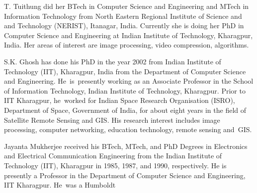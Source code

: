 \documentclass{doublecol-new}
\theoremstyle{TH}{
\newtheorem{lemma}{Lemma}[section]
\newtheorem{theorem}{Theorem}
\newtheorem{corrolary}{Corrolary}
\newtheorem{conjecture}[lemma]{Conjecture}
\newtheorem{proposition}[lemma]{Proposition}
\newtheorem{claim}[lemma]{Claim}
\newtheorem{stheorem}[lemma]{Wrong Theorem}
}
\theoremstyle{THrm}{
\newtheorem{definition}{Definition}[section]
\newtheorem{question}{Question}[section]
\newtheorem{remark}{Remark}[section]
\newtheorem{scheme}{Scheme}
}
\theoremstyle{THhit}{
\newtheorem{case}{Case}[section]
}
\begin{document}


\begin{bio}
T. Tuithung did her BTech in Computer Science and Engineering and MTech in
Information Technology from North Eastern Regional Institute of Science and and
Technology (NERIST), Itanagar, India. Currently she is doing her PhD in Computer
Science and Engineering at Indian Institute of Technology, Kharagpur, India. Her
areas of interest are image processing, video compression, algorithms.

\noindent S.K. Ghosh has done his PhD in the year 2002 from Indian
Institute of Technology (IIT), Kharagpur, India from the Department
of Computer Science and Engineering. He~is~presently working as an
Associate Professor in the School of Information Technology, Indian
Institute of Technology, Kharagpur. Prior to IIT Kharagpur, he~worked
for Indian Space Research Organisation (ISRO), Department of Space,
Government of India, for about eight years in the field of Satellite
Remote Sensing and GIS. His research interest includes image
processing, computer networking, education technology, remote sensing
and~GIS.

\noindent Jayanta Mukherjee received his BTech, MTech, and PhD
Degrees in Electronics and Electrical Communication Engineering from
the Indian Institute of Technology (IIT), Kharagpur in 1985, 1987,
and 1990, respectively. He is presently a Professor in the Department
of Computer Science and Engineering, IIT Kharagpur. He~was a
Humboldt\break
\end{bio}

\maketitle\vfill\pagebreak

\maketitle

\thispagestyle{headings}
\end{document}
